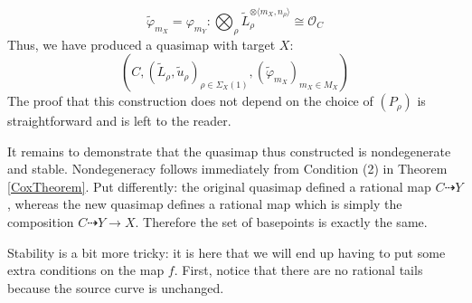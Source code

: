 \documentclass[11pt]{amsart}
\newcommand{\OO}{\mathcal{O}}
\renewcommand{\to}{\rightarrow}
\theoremstyle{plain}
\theoremstyle{definition}
\begin{document}
\begin{equation*} \tilde{\varphi}_{m_X} = \varphi_{m_Y} : \bigotimes_\rho \tilde{L}_\rho^{\otimes \langle m_X, n_\rho \rangle} \cong \OO_C \end{equation*}
Thus, we have produced a quasimap with target $X$:
\begin{equation*} (C, (\tilde{L}_\rho, \tilde{u}_\rho)_{\rho \in \Sigma_X(1)}, (\tilde{\varphi}_{m_X})_{m_X \in M_X}) \end{equation*}
The proof that this construction does not depend on the choice of $(P_\rho)$ is straightforward and is left to the reader.

It remains to demonstrate that the quasimap thus constructed is nondegenerate and stable. Nondegeneracy follows immediately from Condition (2) in Theorem \ref{CoxTheorem}. Put differently: the original quasimap defined a rational map $C \dashrightarrow Y$, whereas the new quasimap defines a rational map which is simply the composition $C \dashrightarrow Y \to X$. Therefore the set of basepoints is exactly the same.

Stability is a bit more tricky: it is here that we will end up having to put some extra conditions on the map $f$. First, notice that there are no rational tails because the source curve is unchanged.
\end{document}
